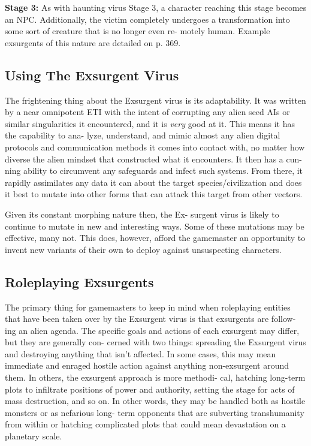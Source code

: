 \textbf{Stage 3:} As with haunting virus Stage 3, a character 
reaching this stage becomes an NPC. Additionally, 
the victim completely undergoes a transformation 
into some sort of creature that is no longer even re-
motely human. Example exsurgents of this nature are 
detailed on p. 369.

\subsection{Using The Exsurgent Virus}

The frightening thing about the Exsurgent virus is 
its adaptability. It was written by a near omnipotent 
ETI with the intent of corrupting any alien seed AIs 
or similar singularities it encountered, and it is \textit{very}
good at it. This means it has the capability to ana-
lyze, understand, and mimic almost any alien digital 
protocols and communication methods it comes into 
contact with, no matter how diverse the alien mindset 
that constructed what it encounters. It then has a cun-
ning ability to circumvent any safeguards and infect 
such systems. From there, it rapidly assimilates any 
data it can about the target species/civilization and 
does it best to mutate into other forms that can attack 
this target from other vectors. 

Given its constant morphing nature then, the Ex-
surgent virus is likely to continue to mutate in new 
and interesting ways. Some of these mutations may 
be effective, many not. This does, however, afford the 
gamemaster an opportunity to invent new variants of 
their own to deploy against unsuspecting characters.

\subsection{Roleplaying Exsurgents}

The primary thing for gamemasters to keep in mind 
when roleplaying entities that have been taken over 
by the Exsurgent virus is that exsurgents are follow-
ing an alien agenda. The specific goals and actions of 
each exsurgent may differ, but they are generally con-
cerned with two things: spreading the Exsurgent virus 
and destroying anything that isn't affected. In some 
cases, this may mean immediate and enraged hostile 
action against anything non-exsurgent around them. 
In others, the exsurgent approach is more methodi-
cal, hatching long-term plots to infiltrate positions of 
power and authority, setting the stage for acts of mass 
destruction, and so on. In other words, they may be 
handled both as hostile monsters or as nefarious long-
term opponents that are subverting transhumanity 
from within or hatching complicated plots that could 
mean devastation on a planetary scale.

